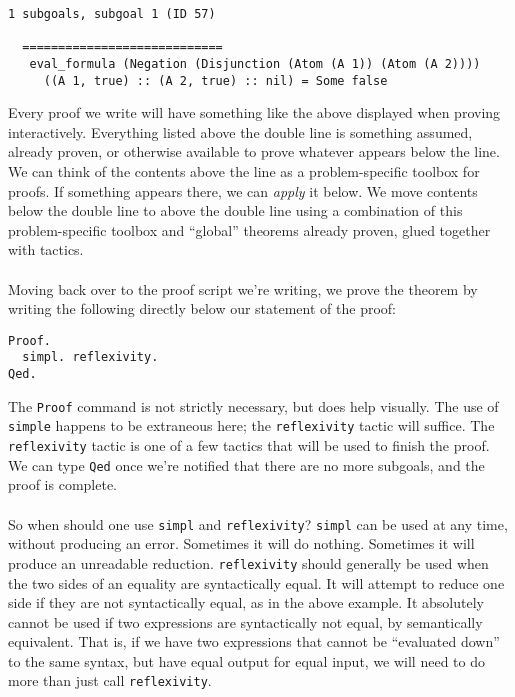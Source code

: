 \documentclass{article}
\begin{document}
\begin{verbatim}
1 subgoals, subgoal 1 (ID 57)

  ============================
   eval_formula (Negation (Disjunction (Atom (A 1)) (Atom (A 2))))
     ((A 1, true) :: (A 2, true) :: nil) = Some false 
\end{verbatim}

Every proof we write will have something like the above displayed when proving interactively. Everything listed above the double line is something assumed, already proven, or otherwise available to prove whatever appears below the line. We can think of the contents above the line as a problem-specific toolbox for proofs. If something appears there, we can \emph{apply} it below. We move contents below the double line to above the double line using a combination of this problem-specific toolbox and ``global'' theorems already proven, glued together with tactics. 

\paragraph{} Moving back over to the proof script we're writing, we prove the theorem by writing the following directly below our statement of the proof:

\begin{lstlisting}                        
Proof.                                                                                                                                                                                                      
  simpl. reflexivity.
Qed.
\end{lstlisting}

The \verb|Proof| command is not strictly necessary, but does help visually. The use of \verb|simple| happens to be extraneous here; the \verb|reflexivity| tactic will suffice. The \verb|reflexivity| tactic is one of a few tactics that will be used to finish the proof. We can type \verb|Qed| once we're notified that there are no more subgoals, and the proof is complete.

\paragraph{} So when should one use \verb|simpl| and \verb|reflexivity|? \verb|simpl| can be used at any time, without producing an error. Sometimes it will do nothing. Sometimes it will produce an unreadable reduction. \verb|reflexivity| should generally be used when the two sides of an equality are syntactically equal. It will attempt to reduce one side if they are not syntactically equal, as in the above example. It absolutely cannot be used if two expressions are syntactically not equal, by semantically equivalent. That is, if we have two expressions that cannot be ``evaluated down'' to the same syntax, but have equal output for equal input, we will need to do more than just call \verb|reflexivity|.
\end{document}
